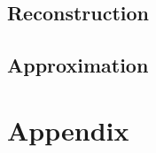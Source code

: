 \documentclass[runningheads,a4paper]{llncs}
\begin{document}
\subsection{Reconstruction}
\subsection{Approximation}

\section{Appendix}

\begin{thebibliography}{4}


\end{thebibliography}
\end{document}
